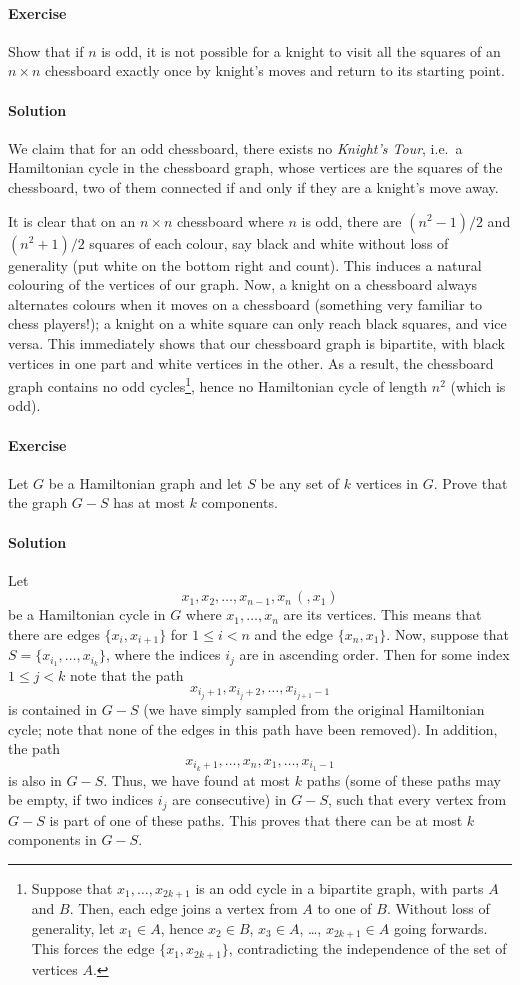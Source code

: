 \documentclass[10pt]{article}
\newcounter{prob}
\newcommand{\problem}{\stepcounter{prob}\paragraph{Exercise \arabic{prob}}}
\newcommand{\solution}{\paragraph{Solution}}
\begin{document}
    
    \problem Show that if $n$ is odd, it is not possible for a knight to visit all
    the squares of an $n \times n$ chessboard exactly once by knight's moves and
    return to its starting point.

    \solution We claim that for an odd chessboard, there exists no \emph{Knight's
    Tour}, i.e.\ a Hamiltonian cycle in the chessboard graph, whose vertices are the
    squares of the chessboard, two of them connected if and only if they are a
    knight's move away.

    It is clear that on an $n \times n$ chessboard where $n$ is odd, there are $(n^2
    - 1) / 2$ and $(n^2 + 1) / 2$ squares of each colour, say black and white without
    loss of generality (put white on the bottom right and count). This induces a
    natural colouring of the vertices of our graph. Now, a knight on a chessboard
    always alternates colours when it moves on a chessboard (something very familiar
    to chess players!); a knight on a white square can only reach black squares, and
    vice versa. This immediately shows that our chessboard graph is bipartite, with
    black vertices in one part and white vertices in the other. As a result, the
    chessboard graph contains no odd cycles\footnote{Suppose that $x_1, \dots, x_{2k
    + 1}$ is an odd cycle in a bipartite graph, with parts $A$ and $B$. Then, each
    edge joins a vertex from $A$ to one of $B$. Without loss of generality, let $x_1
    \in A$, hence $x_2 \in B$, $x_3 \in A$, \dots, $x_{2k + 1} \in A$ going forwards.
    This forces the edge $\{x_1, x_{2k + 1}\}$, contradicting the independence of the
    set of vertices $A$.}, hence no Hamiltonian cycle of length $n^2$ (which is odd).



    \problem Let $G$ be a Hamiltonian graph and let $S$ be any set of $k$ vertices in
    $G$. Prove that the graph $G - S$ has at most $k$ components.

    \solution Let \[
        x_1, x_2, \dots, x_{n - 1}, x_n\, (, x_1)
    \] be a Hamiltonian cycle in $G$ where $x_1, \dots, x_n$ are its vertices. This
    means that there are edges $\{x_i, x_{i + 1}\}$ for $1 \leq i < n$ and the edge
    $\{x_n, x_1\}$. Now, suppose that $S = \{x_{i_1}, \dots, x_{i_k}\}$, where the
    indices $i_j$ are in ascending order. Then for some index $1 \leq j < k$ note
    that the path \[
        x_{i_j + 1}, x_{i_j + 2}, \dots, x_{i_{j + 1} - 1}
    \] is contained in $G - S$ (we have simply sampled from the original Hamiltonian
    cycle; note that none of the edges in this path have been removed). In addition,
    the path \[
        x_{i_k + 1}, \dots, x_n, x_1, \dots, x_{i_1 - 1}
    \] is also in $G - S$. Thus, we have found at most $k$ paths (some of these paths
    may be empty, if two indices $i_j$ are consecutive) in $G - S$, such that every
    vertex from $G - S$ is part of one of these paths. This proves that there can be
    at most $k$ components in $G - S$.
\end{document}
